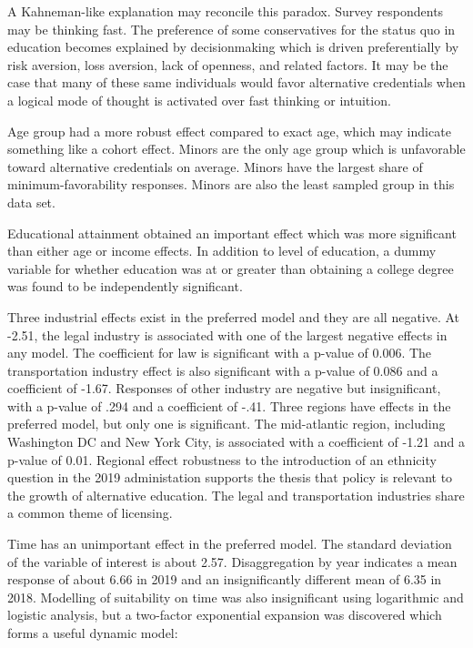 \documentclass[AER]{./aea-latex-templates/AEA}
\begin{document}
        A Kahneman-like explanation may reconcile this paradox.
        Survey respondents may be thinking fast\cite{kahneman2011thinking}.
        The preference of some conservatives for the status quo in education becomes explained by
        decisionmaking which is driven preferentially by
        risk aversion, loss aversion, lack of openness, and related factors.
        It may be the case that many of these same individuals would favor alternative
        credentials when a logical mode of thought is activated over fast thinking or intuition.
        
        Age group had a more robust effect compared to exact age, which may
        indicate something like a cohort effect.
        Minors are the only age group which is unfavorable toward alternative credentials on average.
        Minors have the largest share of minimum-favorability responses.
        Minors are also the least sampled group in this data set.
        
        Educational attainment obtained an important effect which was more
        significant than either age or income effects. In addition to level of
        education, a dummy variable for whether education was at or greater than
        obtaining a college degree was found to be independently significant.
        
        Three industrial effects exist in the preferred model and they are all negative.
        At -2.51, the legal industry is associated with one of the largest negative effects in any model.
        The coefficient for law is significant with a p-value of 0.006.
        The transportation industry effect is also significant with a p-value of 0.086 and a coefficient of -1.67.
        Responses of other industry are negative but insignificant, with a p-value of .294 and a coefficient of -.41.
        Three regions have effects in the preferred model, but only one is significant.
        The mid-atlantic region, including Washington DC and New York City, is associated with a coefficient of -1.21 and a p-value of 0.01.
        Regional effect robustness to the introduction of an ethnicity question in the 2019 administation supports the thesis that policy is relevant to the growth of alternative education.
        The legal and transportation industries share a common theme of licensing.
        
        Time has an unimportant effect in the preferred model.
        The standard deviation of the variable of interest is about 2.57.
        Disaggregation by year indicates a mean response of about 6.66 in 2019 and an insignificantly
        different mean of 6.35 in 2018.
        Modelling of suitability on time was also insignificant using logarithmic and logistic analysis,
        but a two-factor exponential expansion was discovered which forms a useful dynamic model:
        
\end{document}

